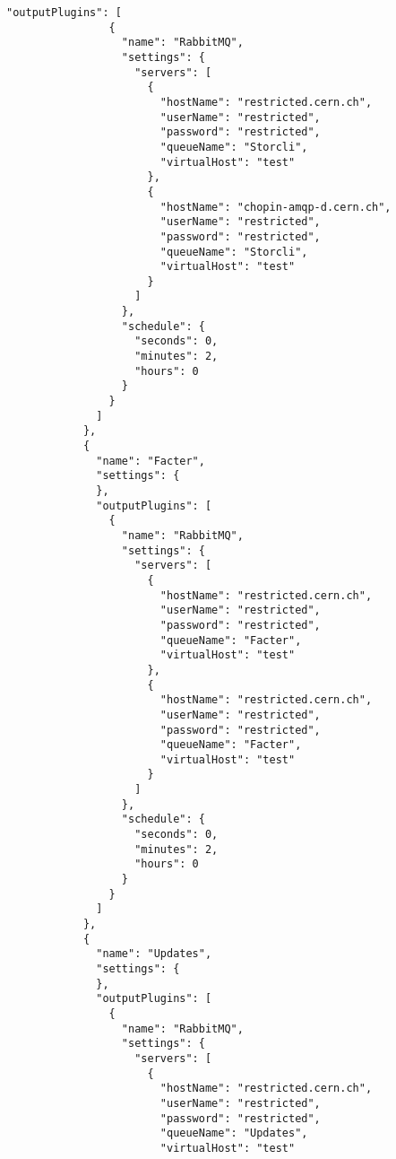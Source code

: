 \begin{lstlisting}[style=csharp, caption=Fichero de configuración]
              "outputPlugins": [
                {
                  "name": "RabbitMQ",
                  "settings": {
                    "servers": [
                      {
                        "hostName": "restricted.cern.ch",
                        "userName": "restricted",
                        "password": "restricted",
                        "queueName": "Storcli",
                        "virtualHost": "test"
                      },
                      {
                        "hostName": "chopin-amqp-d.cern.ch",
                        "userName": "restricted",
                        "password": "restricted",
                        "queueName": "Storcli",
                        "virtualHost": "test"
                      }
                    ]
                  },
                  "schedule": {
                    "seconds": 0,
                    "minutes": 2,
                    "hours": 0
                  }
                }
              ]
            },
            {
              "name": "Facter",
              "settings": {
              },
              "outputPlugins": [
                {
                  "name": "RabbitMQ",
                  "settings": {
                    "servers": [
                      {
                        "hostName": "restricted.cern.ch",
                        "userName": "restricted",
                        "password": "restricted",
                        "queueName": "Facter",
                        "virtualHost": "test"
                      },
                      {
                        "hostName": "restricted.cern.ch",
                        "userName": "restricted",
                        "password": "restricted",
                        "queueName": "Facter",
                        "virtualHost": "test"
                      }
                    ]
                  },
                  "schedule": {
                    "seconds": 0,
                    "minutes": 2,
                    "hours": 0
                  }
                }
              ]
            },
            {
              "name": "Updates",
              "settings": {
              },
              "outputPlugins": [
                {
                  "name": "RabbitMQ",
                  "settings": {
                    "servers": [
                      {
                        "hostName": "restricted.cern.ch",
                        "userName": "restricted",
                        "password": "restricted",
                        "queueName": "Updates",
                        "virtualHost": "test"

\end{lstlisting}

